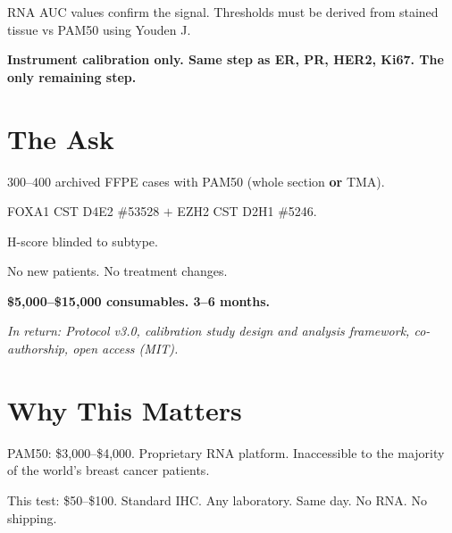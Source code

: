 \documentclass[9pt, a4paper]{article}
\begin{document}
\begin{multicols}{3}
\begin{mdframed}
{RNA AUC values confirm the signal.
Thresholds must be derived from stained
tissue vs PAM50 using Youden J.

\textbf{Instrument calibration only.
Same step as ER, PR, HER2, Ki67.
The only remaining step.}}
\end{mdframed}

\columnbreak

\section{The Ask}

\begin{mdframed}[backgroundcolor=askbox,
                 linecolor=green!50!black,
                 linewidth=0.6pt,
                 innertopmargin=2pt,
                 innerbottommargin=2pt,
                 innerleftmargin=4pt,
                 innerrightmargin=4pt,
                 skipabove=0pt,
                 skipbelow=2pt]
{\small
$300$--$400$ archived FFPE cases with
PAM50 (whole section \textbf{or} TMA).

FOXA1 CST D4E2 \#53528 $+$
EZH2 CST D2H1 \#5246.

H-score blinded to subtype.

No new patients.
No treatment changes.

\textbf{\$5,000--\$15,000 consumables.
3--6 months.}

\smallskip
\textit{In return: Protocol v3.0,
calibration study design and analysis framework,
co-authorship, open access (MIT).}}
\end{mdframed}

\section{Why This Matters}

\begin{mdframed}[backgroundcolor=equitybox,
                 linecolor=orange!50!black,
                 linewidth=0.6pt,
                 innertopmargin=2pt,
                 innerbottommargin=2pt,
                 innerleftmargin=4pt,
                 innerrightmargin=4pt,
                 skipabove=0pt,
                 skipbelow=2pt]
{\small
PAM50: \$3,000--\$4,000.
Proprietary RNA platform.
Inaccessible to the majority
of the world's breast cancer patients.

\smallskip
This test: \$50--\$100.
Standard IHC. Any laboratory.
Same day. No RNA. No shipping.

}
\end{mdframed}
\end{multicols}
\end{document}
